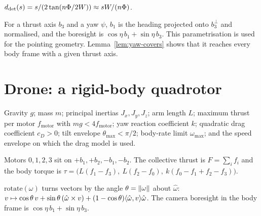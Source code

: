 \begin{definition}
\label{def:detect-range}
\leanok
{}
$d_{\mathrm{det}}(s)=s/(2\tan(n\Phi/2W))\approx sW/(n\Phi)$.
\end{definition}

\begin{definition}
\label{def:cam-axis}
\leanok
For a thrust axis $b_3$ and a yaw $\psi$, $b_1$ is the heading projected onto
$b_3^\perp$ and normalised, and the boresight is $\cos\eta\,b_1+\sin\eta\,b_3$.
This parametrisation is used for the pointing geometry. Lemma~\ref{lem:yaw-covers}
shows that it reaches every body frame with a given thrust axis.
\end{definition}

\section{Drone: a rigid-body quadrotor}

\begin{definition}
\label{def:quad-params}
\leanok
Gravity $g$; mass $m$; principal inertias $J_x,J_y,J_z$; arm length $L$; maximum
thrust per motor $f_{\mathrm{motor}}$ with $mg<4f_{\mathrm{motor}}$; yaw reaction
coefficient $k$; quadratic drag coefficient $c_D>0$; tilt envelope
$\theta_{\max}<\pi/2$; body-rate limit $\omega_{\max}$; and the speed envelope on
which the drag model is used.
\end{definition}

\begin{definition}
\label{def:mixing}
\leanok
Motors $0,1,2,3$ sit on $+b_1,+b_2,-b_1,-b_2$. The collective thrust is
$F=\sum_i f_i$ and the body torque is
$\tau=\bigl(L(f_1-f_3),\ L(f_2-f_0),\ k(f_0-f_1+f_2-f_3)\bigr)$.
\end{definition}

\begin{definition}
\label{def:rotate}
\leanok
$\mathrm{rotate}(\omega)$ turns vectors by the angle $\theta=\lVert \omega \rVert$ about
$\hat\omega$:
$v\mapsto\cos\theta\,v+\sin\theta\,(\hat\omega\times v)+(1-\cos\theta)\langle \hat\omega, v \rangle\hat\omega$.
The camera boresight in the body frame is $\cos\eta\,b_1+\sin\eta\,b_3$.
\end{definition}


